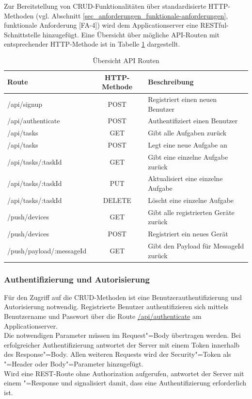 Zur Bereitstellung von CRUD-Funktionalitäten über standardisierte HTTP-Methoden (vgl. Abschnitt \ref{sec_anforderungen_funktionale-anforderungen}, funktionale Anforderung [FA-4]) wird dem Applicationserver eine RESTful-Schnittstelle hinzugefügt. Eine Übersicht über mögliche API-Routen mit entsprechender HTTP-Methode ist in Tabelle \ref{tbl_konzeption_rest} dargestellt. 

\begin{table}[h]
\centering
\begin{tabular}{l | c | l }
    \textbf{Route} & \textbf{HTTP-Methode} & \textbf{Beschreibung} \\
    \hline\hline
    /api/signup & POST & Registriert einen neuen Benutzer \\
    /api/authenticate & POST & Authentifiziert einen Benutzer \\
    \hline
    /api/tasks & GET & Gibt alle Aufgaben zurück \\
    /api/tasks & POST & Legt eine neue Aufgabe an \\
    /api/tasks/:taskId & GET & Gibt eine einzelne Aufgabe zurück \\
    /api/tasks/:taskId & PUT & Aktualisiert eine einzelne Aufgabe \\
    /api/tasks/:taskId & DELETE & Löscht eine einzelne Aufgabe \\
    \hline
    /push/devices & GET & Gibt alle registrierten Geräte zurück \\
    /push/devices & POST & Registriert ein neues Gerät \\
    /push/payload/:messageId & GET & Gibt den Payload für MessageId zurück \\
\end{tabular}
\caption{Übersicht API Routen}
\label{tbl_konzeption_rest}
\end{table}

\subsubsection{Authentifizierung und Autorisierung} 

Für den Zugriff auf die CRUD-Methoden ist eine Benutzerauthentifizierung und Autorisierung notwendig. Registrierte Benutzer authentifizieren sich mittels Benutzername und Passwort über die Route \url{/api/authenticate} am Applicationserver. \\
Die notwendigen Parameter müssen im Request"=Body übertragen werden. Bei erfolgreicher Authentifizierung antwortet der Server mit einem Token innerhalb des Response"=Body. Allen weiteren Requests wird der Security"=Token als "=Header oder Body"=Parameter hinzugefügt. \\
Wird eine REST-Route ohne Authorization aufgerufen, antwortet der Server mit einem "=Response und signalisiert damit, dass eine Authentifizierung erforderlich ist. 

